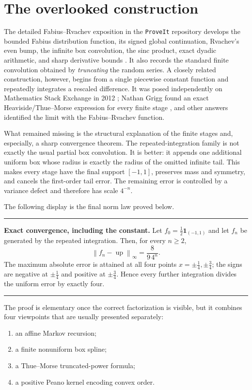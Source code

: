 \documentclass[11pt,oneside]{article}
\theoremstyle{definition}
\theoremstyle{remark}
\newcommand{\Up}{\operatorname{up}}
\newcommand{\norm}[1]{\left\lVert #1\right\rVert}
\newenvironment{boxedremark}{%
  \par\smallskip\noindent\begin{center}\begin{minipage}{0.94\textwidth}%
  \color{black}\hrule\vspace{0.6em}\small
}{%
  \vspace{0.6em}\hrule\end{minipage}\end{center}\smallskip
}
\begin{document}
\tableofcontents
\newpage

\section{The overlooked construction}
\label{sec:introduction}

The detailed Fabius--Rvachev exposition in the \texttt{ProveIt} repository develops the
bounded Fabius distribution function, its signed global continuation, Rvachev's even bump,
the infinite box convolution, the sinc product, exact dyadic arithmetic, and sharp derivative
bounds \cite{companion,proveit}.  It also records the standard finite convolution obtained by
\emph{truncating} the random series.  A closely related construction, however, begins from a
single piecewise constant function and repeatedly integrates a rescaled difference.  It was
posed independently on Mathematics Stack Exchange in 2012 \cite{msequestion}; Nathan Grigg
found an exact Heaviside/Thue--Morse expression for every finite stage \cite{mseanswer}, and
other answers identified the limit with the Fabius--Rvachev function.

What remained missing is the structural explanation of the finite stages and, especially, a
sharp convergence theorem.  The repeated-integration family is not exactly the usual partial
box convolution.  It is better: it appends one additional uniform box whose radius is exactly
the radius of the omitted infinite tail.  This makes every stage have the final support
$[-1,1]$, preserves mass and symmetry, and cancels the first-order tail error.  The remaining
error is controlled by a variance defect and therefore has scale $4^{-n}$.

The following display is the final norm law proved below.

\begin{boxedremark}
\textbf{Exact convergence, including the constant.}
Let $f_0=\tfrac12\mathbf 1_{(-1,1)}$ and let $f_n$ be generated by the repeated integration.
Then, for every $n\ge2$,
\[
 \boxed{\displaystyle \norm{f_n-\Up}_{\infty}=\frac{8}{9\,4^n}.}
\]
The maximum absolute error is attained at all four points
$x=\pm\tfrac14,\pm\tfrac34$; the signs are negative at $\pm\tfrac14$ and positive at
$\pm\tfrac34$.  Hence every further integration divides the uniform error by exactly four.
\end{boxedremark}

The proof is elementary once the correct factorization is visible, but it combines four
viewpoints that are usually presented separately:
\begin{enumerate}
\item an affine Markov recursion;
\item a finite nonuniform box spline;
\item a Thue--Morse truncated-power formula;
\item a positive Peano kernel encoding convex order.
\end{enumerate}
\end{document}
